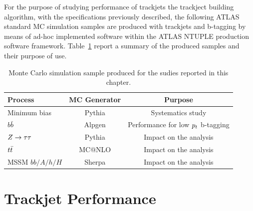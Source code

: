 For the purpose of studying performance of trackjets the trackject building algorithm, with the 
specifications previously described, the following ATLAS standard MC simulation samples are produced
with trackjets and b-tagging by means of ad-hoc implemented software within the ATLAS NTUPLE
production software framework. Table~\ref{tab:tackjetSample} report a summary of the produced samples
and their purpose of use.

\begin{table}[tp]
\centering
	\begin{tabular}{l c c}
	\hline
	\hline
	Process		&	MC Generator 	& Purpose				\\
	\hline
	Minimum bias	& Pythia		& Systematics study 			\\
	$b\bar{b}$ 	& Alpgen		& Performance for low $p_{t}$ b-tagging 	\\
	$Z\rightarrow \tau\tau$ 	& Pythia		& Impact on the analysis  	\\
	$t\bar{t}$	& MC@NLO		& Impact on the analysis \\
	MSSM $bb/A/h/H$ & Sherpa		& Impact on the analysis \\ 
	\hline
	\hline
	\end{tabular}
	\caption{Monte Carlo simulation sample produced for the sudies reported in this chapter.}
	\label{tab:tackjetSample}
\end{table}
	




\section{Trackjet Performance}
